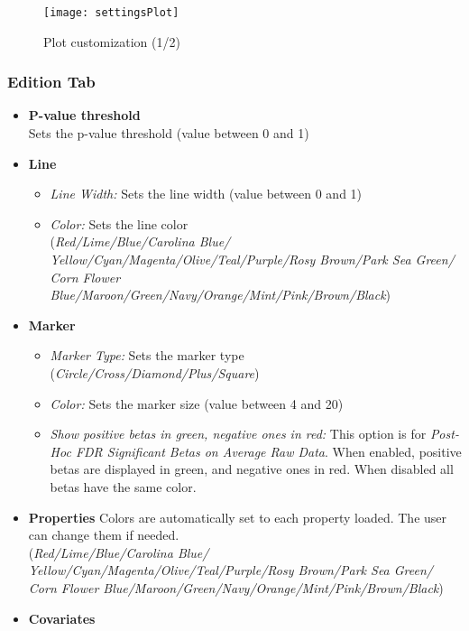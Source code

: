 \documentclass[fadttsterUserGuide_use]{subfiles}
\begin{document}
 	\vfill
	\newpage
	
	\begin{figure}[H]
  		\centering
    	\texttt{[image: settingsPlot]}
    	\caption{Plot customization (1/2)}
    	\label{fig:settingsPlot}
    \end{figure}
    \vfill
	\newpage
	
	\subsubsection{Edition Tab}
	\begin{itemize}
		\item \textbf{P-value threshold}\\
		Sets the p-value threshold (value between 0 and 1)
		\item \textbf{Line}
		\begin{itemize}
 			\item \textit{Line Width:} Sets the line width (value between 0 and 1)
 			\item \textit{Color:} Sets the line color\\
 			(\textit{Red/Lime/Blue/Carolina Blue/ Yellow/Cyan/Magenta/Olive/Teal/Purple/Rosy Brown/Park Sea Green/ Corn Flower Blue/Maroon/Green/Navy/Orange/Mint/Pink/Brown/Black}) 
 		\end{itemize}
		\item \textbf{Marker}
		\begin{itemize}
 			\item \textit{Marker Type:} Sets the marker type\\
 			(\textit{Circle/Cross/Diamond/Plus/Square})
 			\item \textit{Color:} Sets the marker size (value between 4 and 20)
 			\item \textit{Show positive betas in green, negative ones in red:} This option is for \textit{Post-Hoc FDR Significant Betas on Average Raw Data}. When enabled, positive betas are displayed in green, and negative ones in red. When disabled all betas have the same color.
 		\end{itemize}
		\item \textbf{Properties}
		Colors are automatically set to each property loaded. The user can change them if needed.\\
 			(\textit{Red/Lime/Blue/Carolina Blue/ Yellow/Cyan/Magenta/Olive/Teal/Purple/Rosy Brown/Park Sea Green/ Corn Flower Blue/Maroon/Green/Navy/Orange/Mint/Pink/Brown/Black}) 
		\item \textbf{Covariates}

\end{itemize}
\end{document}
